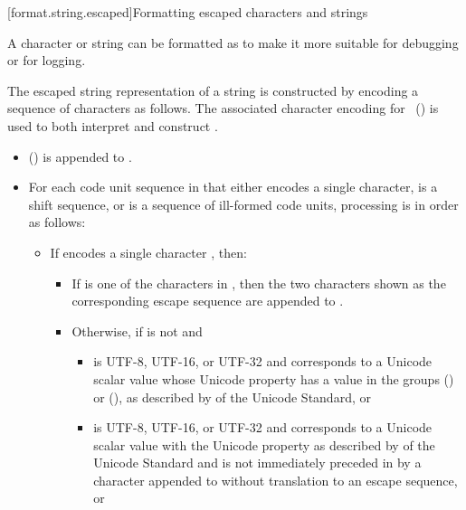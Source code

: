 [format.string.escaped]{Formatting escaped characters and strings}

\pnum
{}%
%
A character or string can be formatted as 
to make it more suitable for debugging or for logging.

\pnum
The escaped string  representation of a string 
is constructed by encoding a sequence of characters as follows.
The associated character encoding 
for ~()
is used to both interpret  and construct .

\begin{itemize}
\item
{} () is appended to .

\item
For each code unit sequence  in  that either
encodes a single character,
is a shift sequence, or
is a sequence of ill-formed code units,
processing is in order as follows:

\begin{itemize}
\item
If  encodes a single character , then:

\begin{itemize}
\item
If  is one of the characters in ,
then the two characters shown as the corresponding escape sequence
are appended to .

\item
Otherwise, if  is not  and

\begin{itemize}
\item
{} is UTF-8, UTF-16, or UTF-32 and
 corresponds to a Unicode scalar value
whose Unicode property  has a value in the groups
 () or  (),
as described by  of the Unicode Standard, or

\item
{} is UTF-8, UTF-16, or UTF-32 and
 corresponds to a Unicode scalar value
with the Unicode property 
as described by  of the Unicode Standard and
 is not immediately preceded in  by
a character  appended to 
without translation to an escape sequence, or


\end{itemize}
\end{itemize}
\end{itemize}
\end{itemize}
